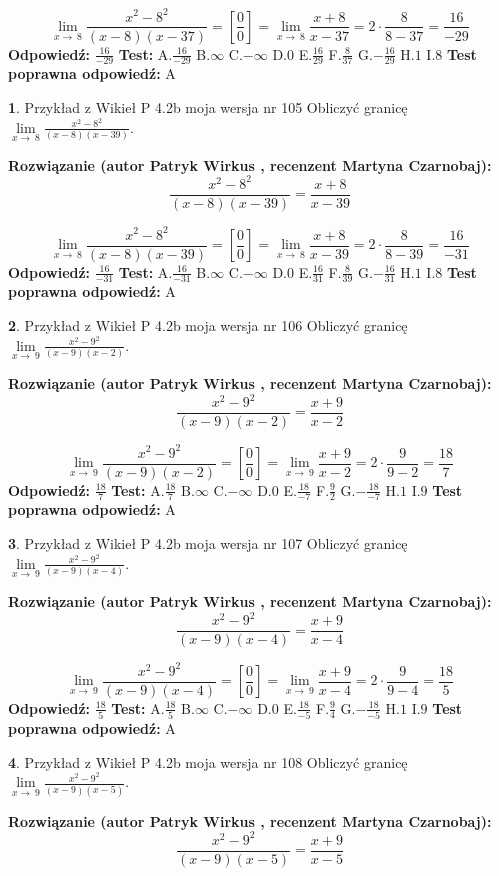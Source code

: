 \documentclass[12pt, a4paper]{article}
\theoremstyle{definition} %
\newtheorem{zad}{}
\newcommand{\zadStart}[1]{\begin{zad}#1\newline}
\newcommand{\zadStop}{\end{zad}}
\newcommand{\rozwStart}[2]{\noindent \textbf{Rozwiązanie (autor #1 , recenzent #2): }\newline}
\newcommand{\rozwStop}{\newline}
\newcommand{\odpStart}{\noindent \textbf{Odpowiedź:}\newline}
\newcommand{\odpStop}{\newline}
\newcommand{\testStart}{\noindent \textbf{Test:}\newline}
\newcommand{\testStop}{\newline}
\newcommand{\kluczStart}{\noindent \textbf{Test poprawna odpowiedź:}\newline}
\newcommand{\kluczStop}{\newline}
\begin{document}
$$\lim\limits_{x\to\ 8}\frac{x^{2}-8^{2}}{(x-8)(x-37)}=[\frac{0}{0}]=\lim\limits_{x\to\ 8}\frac{x+8}{x-37}=2 \cdot \frac{8}{8-37} = \frac{16}{-29}$$
\rozwStop
\odpStart
$\frac{16}{-29}$
\odpStop
\testStart
A.$\frac{16}{-29}$
B.$\infty$
C.$-\infty$
D.$0$
E.$\frac{16}{29}$
F.$\frac{8}{37}$
G.$-\frac{16}{29}$
H.$1$
I.$8$
\testStop
\kluczStart
A
\kluczStop



\zadStart{Przykład z Wikieł P 4.2b moja wersja nr 105}
Obliczyć granicę $\lim\limits_{x\to\ 8}\frac{x^{2}-8^{2}}{(x-8)(x-39)}$.
\zadStop
\rozwStart{Patryk Wirkus}{Martyna Czarnobaj}
$$\frac{x^{2}-8^{2}}{(x-8)(x-39)}=\frac{x+8}{x-39}$$

$$\lim\limits_{x\to\ 8}\frac{x^{2}-8^{2}}{(x-8)(x-39)}=[\frac{0}{0}]=\lim\limits_{x\to\ 8}\frac{x+8}{x-39}=2 \cdot \frac{8}{8-39} = \frac{16}{-31}$$
\rozwStop
\odpStart
$\frac{16}{-31}$
\odpStop
\testStart
A.$\frac{16}{-31}$
B.$\infty$
C.$-\infty$
D.$0$
E.$\frac{16}{31}$
F.$\frac{8}{39}$
G.$-\frac{16}{31}$
H.$1$
I.$8$
\testStop
\kluczStart
A
\kluczStop



\zadStart{Przykład z Wikieł P 4.2b moja wersja nr 106}
Obliczyć granicę $\lim\limits_{x\to\ 9}\frac{x^{2}-9^{2}}{(x-9)(x-2)}$.
\zadStop
\rozwStart{Patryk Wirkus}{Martyna Czarnobaj}
$$\frac{x^{2}-9^{2}}{(x-9)(x-2)}=\frac{x+9}{x-2}$$

$$\lim\limits_{x\to\ 9}\frac{x^{2}-9^{2}}{(x-9)(x-2)}=[\frac{0}{0}]=\lim\limits_{x\to\ 9}\frac{x+9}{x-2}=2 \cdot \frac{9}{9-2} = \frac{18}{7}$$
\rozwStop
\odpStart
$\frac{18}{7}$
\odpStop
\testStart
A.$\frac{18}{7}$
B.$\infty$
C.$-\infty$
D.$0$
E.$\frac{18}{-7}$
F.$\frac{9}{2}$
G.$-\frac{18}{-7}$
H.$1$
I.$9$
\testStop
\kluczStart
A
\kluczStop



\zadStart{Przykład z Wikieł P 4.2b moja wersja nr 107}
Obliczyć granicę $\lim\limits_{x\to\ 9}\frac{x^{2}-9^{2}}{(x-9)(x-4)}$.
\zadStop
\rozwStart{Patryk Wirkus}{Martyna Czarnobaj}
$$\frac{x^{2}-9^{2}}{(x-9)(x-4)}=\frac{x+9}{x-4}$$

$$\lim\limits_{x\to\ 9}\frac{x^{2}-9^{2}}{(x-9)(x-4)}=[\frac{0}{0}]=\lim\limits_{x\to\ 9}\frac{x+9}{x-4}=2 \cdot \frac{9}{9-4} = \frac{18}{5}$$
\rozwStop
\odpStart
$\frac{18}{5}$
\odpStop
\testStart
A.$\frac{18}{5}$
B.$\infty$
C.$-\infty$
D.$0$
E.$\frac{18}{-5}$
F.$\frac{9}{4}$
G.$-\frac{18}{-5}$
H.$1$
I.$9$
\testStop
\kluczStart
A
\kluczStop



\zadStart{Przykład z Wikieł P 4.2b moja wersja nr 108}
Obliczyć granicę $\lim\limits_{x\to\ 9}\frac{x^{2}-9^{2}}{(x-9)(x-5)}$.
\zadStop
\rozwStart{Patryk Wirkus}{Martyna Czarnobaj}
$$\frac{x^{2}-9^{2}}{(x-9)(x-5)}=\frac{x+9}{x-5}$$
\end{document}
